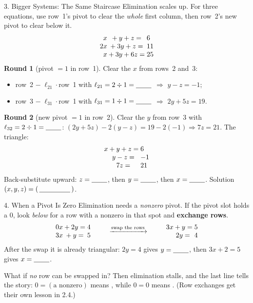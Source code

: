 \documentclass[10pt]{article}
\begin{document}
\begin{notesbox}{3. Bigger Systems: The Same Staircase}
Elimination scales up. For three equations, use row~1's pivot to clear the \emph{whole} first
column, then row~2's new pivot to clear below it.
\[
  \begin{array}{r@{}c@{}l}
    x &{}+ y + z ={}& 6 \\
    2x &{}+ 3y + z ={}& 11 \\
    x &{}+ 3y + 6z ={}& 25
  \end{array}
\]
\textbf{Round 1} (pivot $=1$ in row~1). Clear the $x$ from rows~2 and~3:
\begin{itemize}\setlength{\itemsep}{1pt}
  \item row~2 $-\;\ell_{21}\cdot$row~1 with $\ell_{21}=2\div1=\blank{0.8cm}$ \;$\Rightarrow$\; $y - z = -1$;
  \item row~3 $-\;\ell_{31}\cdot$row~1 with $\ell_{31}=1\div1=\blank{0.8cm}$ \;$\Rightarrow$\; $2y + 5z = 19$.
\end{itemize}
\textbf{Round 2} (new pivot $=1$ in row~2). Clear the $y$ from row~3 with
$\ell_{32}=2\div1=\blank{0.8cm}$: \;$(2y+5z)-2(y-z)=19-2(-1)\Rightarrow 7z=21$. The triangle:
\[
  \begin{array}{r@{}c@{}l}
    x &{}+ y + z ={}& 6 \\
     & y - z ={}& -1 \\
     & 7z ={}& 21
  \end{array}
\]
Back-substitute upward: $z=\blank{0.8cm}$, then $y=\blank{0.8cm}$, then $x=\blank{0.8cm}$.
Solution $(x,y,z)=(\,\blank{1.6cm}\,)$.
\end{notesbox}

\boxguard
\begin{notesbox}{4. When a Pivot Is Zero}
Elimination needs a \emph{nonzero} pivot. If the pivot slot holds a $0$, look \emph{below} for a row
with a nonzero in that spot and \textbf{exchange rows}.
\[
  \begin{array}{r@{}c@{}l}
    0x &{}+ 2y ={}& 4 \\ 3x &{}+ y ={}& 5
  \end{array}
  \qquad\xrightarrow{\text{swap the rows}}\qquad
  \begin{array}{r@{}c@{}l}
    3x &{}+ y ={}& 5 \\ & 2y ={}& 4
  \end{array}
\]
After the swap it is already triangular: $2y=4$ gives $y=\blank{0.8cm}$, then $3x+2=5$ gives
$x=\blank{0.8cm}$.

\vspace{3pt}
What if \emph{no} row can be swapped in? Then elimination stalls, and the last line tells the story:
$0 = (\text{a nonzero})$ means \blank{3.2cm}, while $0=0$ means \blank{3.6cm}. (Row exchanges get
their own lesson in 2.4.)
\end{notesbox}
\end{document}
